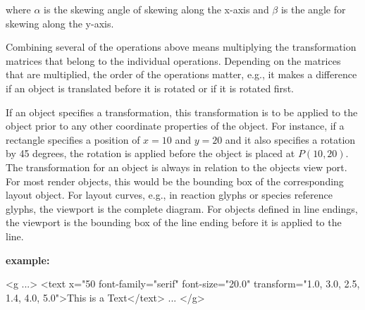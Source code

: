 where $\alpha$ is the skewing angle of skewing along the x-axis and $\beta$ is the angle for skewing along the y-axis.

Combining several of the operations above means multiplying the transformation matrices that belong to the individual operations.
Depending on the matrices that are multiplied, the order of the operations matter, e.g., it makes a difference if an object is translated before it is rotated or if it is rotated first.

If an object specifies a transformation, this transformation is to be applied to the object prior to any other coordinate properties of the object. For instance, if a rectangle specifies a position of $x=10$ and $y=20$ and it also specifies a rotation by 45 degrees, the rotation is applied before the object is placed at $P(10,20)$.
The transformation for an object is always in relation to the objects view port. For most render objects, this would be the bounding box of the corresponding layout object. For layout curves, e.g., in reaction glyphs or species reference glyphs, the viewport is the complete diagram.
For objects defined in line endings, the viewport is the bounding box of the line ending before it is applied to the line.

\vspace*{0.25cm}
{\large
{\bf
example:
}
}

{\footnotesize
\begin{example}
 <g ...>
   <text x="50%
        font-family="serif" font-size="20.0" 
        transform="1.0, 3.0, 2.5, 1.4, 4.0, 5.0">This is a Text</text>
      ...
</g> 
\end{example}
}


